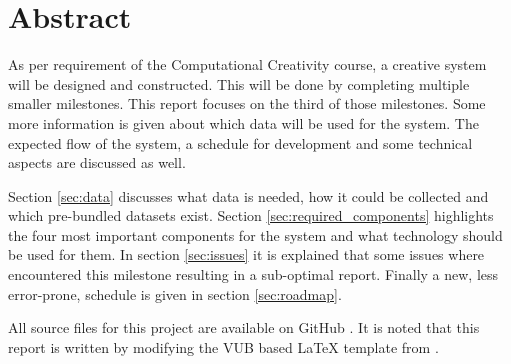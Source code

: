 \chapter*{Abstract}
As per requirement of the Computational Creativity course, a creative system will be designed and constructed.
This will be done by completing multiple smaller milestones.
This report focuses on the third of those milestones.
Some more information is given about which data will be used for the system.
The expected flow of the system, a schedule for development and some technical aspects are discussed as well.

Section \ref{sec:data} discusses what data is needed, how it could be collected and which pre-bundled datasets exist.
Section \ref{sec:required_components} highlights the four most important components for the system and what technology should be used for them.
In section \ref{sec:issues} it is explained that some issues where encountered this milestone resulting in a sub-optimal report. 
Finally a new, less error-prone, schedule is given in section \ref{sec:roadmap}.

All source files for this project are available on GitHub \citep{github_project}. It is noted that this report is written by modifying the VUB based \LaTeX{} template from \citet{latex_template}. 